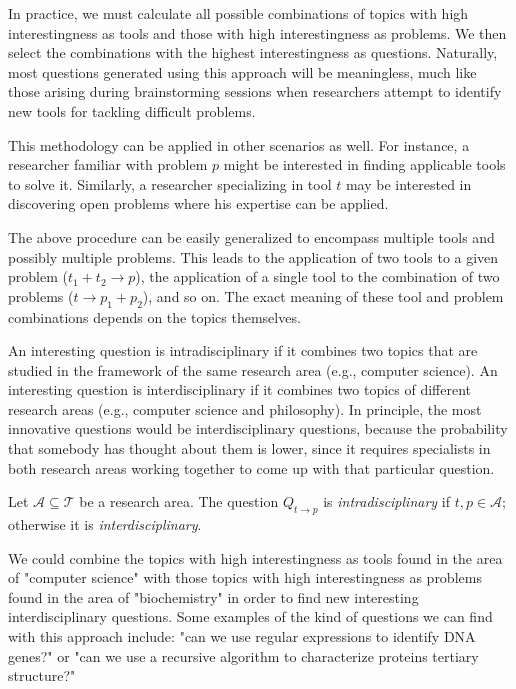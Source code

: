 In practice, we must calculate all possible combinations of topics with high interestingness as tools and those with high interestingness as problems. We then select the combinations with the highest interestingness as questions. Naturally, most questions generated using this approach will be meaningless, much like those arising during brainstorming sessions when researchers attempt to identify new tools for tackling difficult problems.

This methodology can be applied in other scenarios as well. For instance, a researcher familiar with problem $p$ might be interested in finding applicable tools to solve it. Similarly, a researcher specializing in tool $t$ may be interested in discovering open problems where his expertise can be applied.

The above procedure can be easily generalized to encompass multiple tools and possibly multiple problems. This leads to the application of two tools to a given problem ($ t_1 + t_2 \rightarrow p$), the application of a single tool to the combination of two problems ($t \rightarrow p_1 + p_2$), and so on. The exact meaning of these tool and problem combinations depends on the topics themselves.

An interesting question is intradisciplinary if it combines two topics that are studied in the framework of the same research area (e.g., computer science). An interesting question is interdisciplinary if it combines two topics of different research areas (e.g., computer science and philosophy). In principle, the most innovative questions would be interdisciplinary questions, because the probability that somebody has thought about them is lower, since it requires specialists in both research areas working together to come up with that particular question.

\begin{definition}
Let $\mathcal{A}\subseteq\mathcal{T}$ be a research area. The question $Q_{t\to p}$ is \emph{intradisciplinary} if $t,p\in\mathcal{A}$; otherwise it is \emph{interdisciplinary}.
\end{definition}

\begin{example}
We could combine the topics with high interestingness as tools found in the area of "computer science" with those topics with high interestingness as problems found in the area of "biochemistry" in order to find new interesting interdisciplinary questions. Some examples of the kind of questions we can find with this approach include: "can we use regular expressions to identify DNA genes?" or "can we use a recursive algorithm to characterize proteins tertiary structure?"
\end{example}


